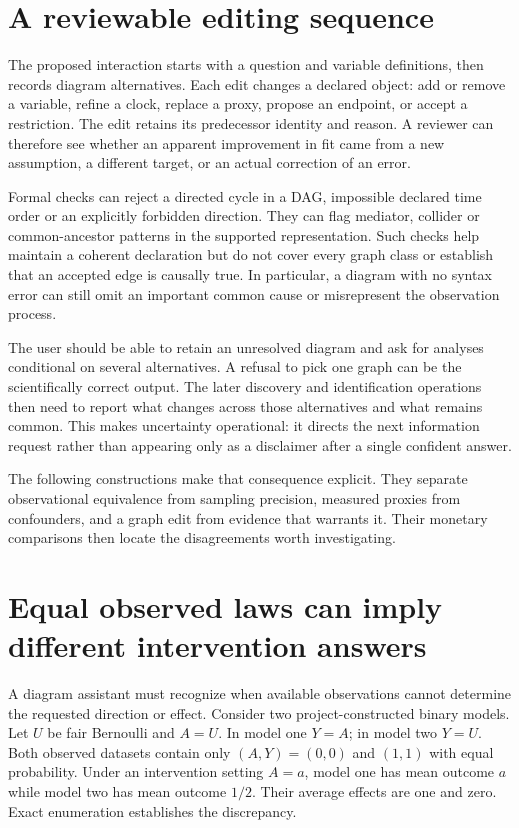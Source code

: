 \section{A reviewable editing sequence}

The proposed interaction starts with a question and variable definitions,
then records diagram alternatives. Each edit changes a declared object:
add or remove a variable, refine a clock, replace a proxy, propose an endpoint,
or accept a restriction. The edit retains its predecessor identity and
reason. A reviewer can therefore see whether an apparent improvement in
fit came from a new assumption, a different target, or an actual correction
of an error.

Formal checks can reject a directed cycle in a DAG, impossible declared
time order or an explicitly forbidden direction. They can flag mediator,
collider or common-ancestor patterns in the supported representation. Such
checks help maintain a coherent declaration but do not cover every graph
class or establish that an accepted edge is causally true. In particular,
a diagram with no syntax error can still omit an important common cause or
misrepresent the observation process.

The user should be able to retain an unresolved diagram and ask for analyses
conditional on several alternatives. A refusal to pick one graph can be the
scientifically correct output. The later discovery and identification
operations then need to report what changes across those alternatives and
what remains common. This makes uncertainty operational: it directs the
next information request rather than appearing only as a disclaimer after
a single confident answer.

The following constructions make that consequence explicit. They separate
observational equivalence from sampling precision, measured proxies from
confounders, and a graph edit from evidence that warrants it. Their monetary
comparisons then locate the disagreements worth investigating.


\section{Equal observed laws can imply different intervention answers}
\label{v13:la-equivalence}

A diagram assistant must recognize when available observations cannot determine
the requested direction or effect. Consider two project-constructed binary
models. Let $U$ be fair Bernoulli and $A=U$. In model one $Y=A$; in model two
$Y=U$. Both observed datasets contain only $(A,Y)=(0,0)$ and $(1,1)$ with equal
probability. Under an intervention setting $A=a$, model one has mean outcome
$a$ while model two has mean outcome $1/2$. Their average effects are one and
zero. Exact enumeration establishes the discrepancy. \cite{v13_project_exact}

